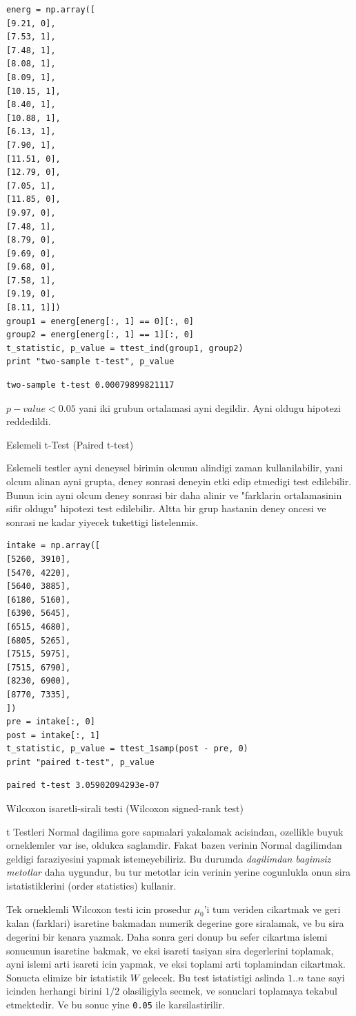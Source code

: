 \documentclass[12pt,fleqn]{article}\usepackage{../common}
\begin{document}
\begin{verbatim}
energ = np.array([
[9.21, 0],
[7.53, 1],
[7.48, 1],
[8.08, 1],
[8.09, 1],
[10.15, 1],
[8.40, 1],
[10.88, 1],
[6.13, 1],
[7.90, 1],
[11.51, 0],
[12.79, 0],
[7.05, 1],
[11.85, 0],
[9.97, 0],
[7.48, 1],
[8.79, 0],
[9.69, 0],
[9.68, 0],
[7.58, 1],
[9.19, 0],
[8.11, 1]])
group1 = energ[energ[:, 1] == 0][:, 0]
group2 = energ[energ[:, 1] == 1][:, 0]
t_statistic, p_value = ttest_ind(group1, group2)
print "two-sample t-test", p_value
\end{verbatim}

\begin{verbatim}
two-sample t-test 0.00079899821117
\end{verbatim}

$p-value < 0.05$ yani iki grubun ortalamasi ayni degildir. Ayni oldugu
hipotezi reddedildi.

Eslemeli t-Test (Paired t-test)

Eslemeli testler ayni deneysel birimin olcumu alindigi zaman
kullanilabilir, yani olcum alinan ayni grupta, deney sonrasi deneyin
etki edip etmedigi test edilebilir. Bunun icin ayni olcum deney
sonrasi bir daha alinir ve "farklarin ortalamasinin sifir oldugu"
hipotezi test edilebilir. Altta bir grup hastanin deney oncesi ve
sonrasi ne kadar yiyecek tukettigi listelenmis. 

\begin{verbatim}
intake = np.array([
[5260, 3910],
[5470, 4220],
[5640, 3885],
[6180, 5160],
[6390, 5645],
[6515, 4680],
[6805, 5265],
[7515, 5975],
[7515, 6790],
[8230, 6900],
[8770, 7335],
])
pre = intake[:, 0]
post = intake[:, 1]
t_statistic, p_value = ttest_1samp(post - pre, 0)
print "paired t-test", p_value
\end{verbatim}

\begin{verbatim}
paired t-test 3.05902094293e-07
\end{verbatim}

Wilcoxon isaretli-sirali testi (Wilcoxon signed-rank test)

t Testleri Normal dagilima gore sapmalari yakalamak acisindan,
ozellikle buyuk orneklemler var ise, oldukca saglamdir. Fakat bazen
verinin Normal dagilimdan geldigi faraziyesini yapmak istemeyebiliriz.
Bu durumda {\em dagilimdan bagimsiz metotlar} daha uygundur, bu tur
metotlar icin verinin yerine cogunlukla onun sira istatistiklerini
(order statistics) kullanir.

Tek orneklemli Wilcoxon testi icin prosedur $\mu_0$'i tum veriden
cikartmak ve geri kalan (farklari) isaretine bakmadan numerik degerine
gore siralamak, ve bu sira degerini bir kenara yazmak. Daha sonra geri
donup bu sefer cikartma islemi sonucunun isaretine bakmak, ve eksi
isareti tasiyan sira degerlerini toplamak, ayni islemi arti isareti
icin yapmak, ve eksi toplami arti toplamindan cikartmak. Sonucta
elimize bir istatistik $W$ gelecek. Bu test istatistigi aslinda $1..n$
tane sayi icinden herhangi birini $1/2$ olasiligiyla secmek, ve
sonuclari toplamaya tekabul etmektedir. Ve bu sonuc yine \verb!0.05!
ile karsilastirilir.
\end{document}
